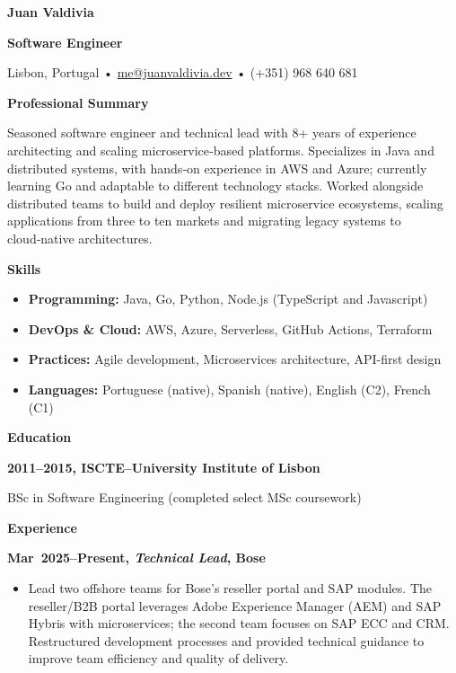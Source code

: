 \documentclass[a4paper,12pt]{memoir}
\newcommand{\cvheading}[1]{{\Large\bfseries\color{RoyalBlue} #1} \par\vspace{.6\baselineskip}}
\newcommand{\cvsubheading}[1]{{\large\bfseries #1} \bigbreak}
\newcommand{\Sep}{\vspace{1em}}
\newcommand{\SmallSep}{\vspace{0.5em}}
\newcommand{\CVSection}[1]{{\large\textbf{#1}}\par\SmallSep}
\newcommand{\CVItem}[2]{\textbf{\color{RoyalBlue} #1}\par\small{#2}\SmallSep}
\begin{document}
\cvheading{Juan Valdivia}
\cvsubheading{Software Engineer}

\small{Lisbon, Portugal • \url{me@juanvaldivia.dev} • (+351) 968 640 681}\\
\SmallSep

\CVSection{Professional Summary}
Seasoned software engineer and technical lead with 8+ years of experience architecting and scaling microservice‑based platforms. Specializes in Java and distributed systems, with hands‑on experience in AWS and Azure; currently learning Go and adaptable to different technology stacks. Worked alongside distributed teams to build and deploy resilient microservice ecosystems, scaling applications from three to ten markets and migrating legacy systems to cloud‑native architectures.
\Sep

\CVSection{Skills}
\begin{itemize}[leftmargin=*,label={•}]
    \item \textbf{Programming:} Java, Go, Python, Node.js (TypeScript and Javascript)
    \item \textbf{DevOps \& Cloud:} AWS, Azure, Serverless, GitHub Actions, Terraform
    \item \textbf{Practices:} Agile development, Microservices architecture, API-first design
    \item \textbf{Languages:} Portuguese (native), Spanish (native), English (C2), French (C1)
\end{itemize}
\Sep



\CVSection{Education}
\CVItem{2011--2015, ISCTE–University Institute of Lisbon}{BSc in Software Engineering (completed select MSc coursework)}
\Sep

\CVSection{Experience}
\CVItem{Mar 2025–Present, \textit{Technical Lead}, Bose}{
\begin{itemize}[leftmargin=*,label={•}]
    \item Lead two offshore teams for Bose’s reseller portal and SAP modules. The reseller/B2B portal leverages Adobe Experience Manager (AEM) and SAP Hybris with microservices; the second team focuses on SAP ECC and CRM. Restructured development processes and provided technical guidance to improve team efficiency and quality of delivery.
\end{itemize}
}
\end{document}
